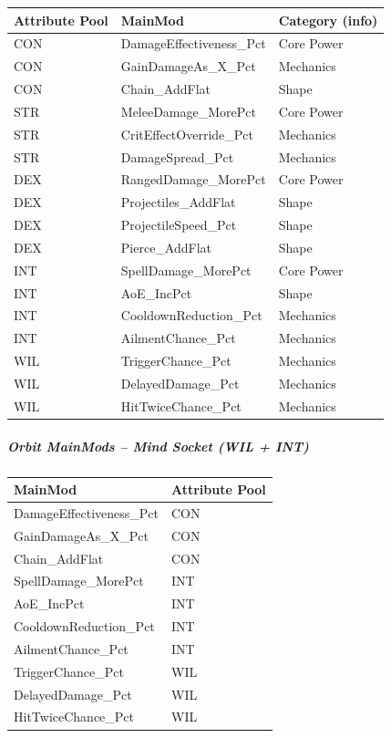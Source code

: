 \begin{tabular}{l|l|l}
	\textbf{Attribute Pool} & \textbf{MainMod} & \textbf{Category (info)} \\ \hline
	
	CON & DamageEffectiveness\_Pct & Core Power \\
	CON & GainDamageAs\_X\_Pct & Mechanics \\
	CON & Chain\_AddFlat & Shape \\ \hline
	
	STR & MeleeDamage\_MorePct & Core Power \\
	STR & CritEffectOverride\_Pct & Mechanics \\
	STR & DamageSpread\_Pct & Mechanics \\ \hline
	
	DEX & RangedDamage\_MorePct & Core Power \\
	DEX & Projectiles\_AddFlat & Shape \\
	DEX & ProjectileSpeed\_Pct & Shape \\
	DEX & Pierce\_AddFlat & Shape \\ \hline
	
	INT & SpellDamage\_MorePct & Core Power \\
	INT & AoE\_IncPct & Shape \\
	INT & CooldownReduction\_Pct & Mechanics \\
	INT & AilmentChance\_Pct & Mechanics \\ \hline
	
	WIL & TriggerChance\_Pct & Mechanics \\
	WIL & DelayedDamage\_Pct & Mechanics \\
	WIL & HitTwiceChance\_Pct & Mechanics \\
	
\end{tabular}

\subparagraph{Orbit MainMods -- Mind Socket (WIL + INT)}
\begin{tabular}{l|l}
	\textbf{MainMod} & \textbf{Attribute Pool} \\ \hline
	DamageEffectiveness\_Pct & CON \\
	GainDamageAs\_X\_Pct & CON \\
	Chain\_AddFlat & CON \\
	SpellDamage\_MorePct & INT \\
	AoE\_IncPct & INT \\
	CooldownReduction\_Pct & INT \\
	AilmentChance\_Pct & INT \\
	TriggerChance\_Pct & WIL \\
	DelayedDamage\_Pct & WIL \\
	HitTwiceChance\_Pct & WIL \\
\end{tabular}

